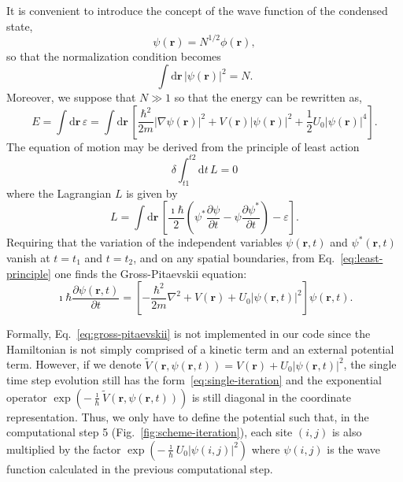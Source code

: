 It is convenient to introduce the concept of the wave function of the condensed state,
\begin{equation}
\psi(\textbf{r}) = N^{1/2} \phi(\textbf{r}),
\end{equation}
so that the normalization condition becomes
\begin{equation} \label{eq:normalization-N}
\int \mathrm{d}\textbf{r} \, |\psi(\textbf{r})|^2 = N.
\end{equation}
Moreover, we suppose that $N \gg 1$ so that the energy can be rewritten as,
\begin{equation}
E = \int \mathrm{d} \textbf{r} \, \varepsilon  = \int \mathrm{d} \textbf{r} \, \left[ \frac{\hbar^2}{2m} |\nabla \psi(\textbf{r}) |^2 + V(\textbf{r}) |\psi(\textbf{r})|^2 + \frac{1}{2} U_0 |\psi(\textbf{r})|^4 \right].
\end{equation}
The equation of motion may be derived from the principle of least action 
\begin{equation}
\delta \int_{t1}^{t2} \mathrm{d} t \, L = 0 \label{eq:least-principle}
\end{equation}
where the Lagrangian $L$ is given by
\begin{equation}
L = \int \mathrm{d} \textbf{r} \, \left[ \frac{\imath \hbar}{2} \left( \psi^\ast \frac{\partial \psi}{\partial t} - \psi \frac{\partial \psi^\ast}{\partial t} \right) - \varepsilon \right].
\end{equation}
Requiring that the variation of the independent variables $\psi(\textbf{r},t)$ and $\psi^\ast (\textbf{r},t)$ vanish at $t=t_1$ and $t=t_2$, and on any spatial boundaries, from Eq.~\eqref{eq:least-principle} one finds the Gross-Pitaevskii equation:
\begin{equation} \label{eq:gross-pitaevskii}
\imath \hbar \frac{\partial \psi(\textbf{r}, t)}{\partial t} = \left[ - \frac{\hbar^2}{2m} \nabla^2 + V(\textbf{r}) + U_0 |\psi(\textbf{r}, t)|^2 \right] \psi(\textbf{r}, t).
\end{equation}

Formally, Eq.~\eqref{eq:gross-pitaevskii} is not implemented in our code since the Hamiltonian is not simply comprised of a kinetic term and an external potential term. However, if we denote $\tilde{V}(\textbf{r}, \psi(\textbf{r}, t)) = V(\textbf{r}) + U_0 |\psi(\textbf{r}, t)|^2$, the single time step evolution still has the form~\eqref{eq:single-iteration} and the exponential operator $\exp \left( - \frac{\imath}{\hbar} \tilde{V}(\textbf{r}, \psi(\textbf{r}, t)) \right)$ is still diagonal in the coordinate representation. Thus, we only have to define the potential such that, in the computational step 5 (Fig.~\ref{fig:scheme-iteration}), each site $(i,j)$ is also multiplied by the factor $\exp(-\frac{\imath}{\hbar} U_0 |\psi(i,j)|^2)$ where $\psi(i,j)$ is the wave function calculated in the previous computational step.

